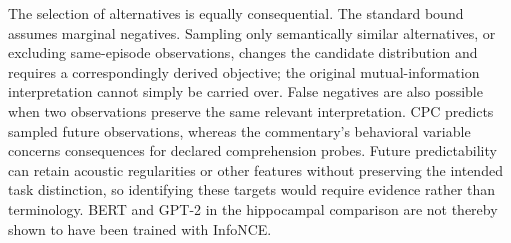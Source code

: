 \documentclass[11pt]{article}
\begin{document}
The selection of alternatives is equally consequential. The standard
bound assumes marginal negatives. Sampling only semantically similar
alternatives, or excluding same-episode observations, changes the
candidate distribution and requires a correspondingly derived objective;
the original mutual-information interpretation cannot simply be carried
over. False negatives are also possible when two observations preserve
the same relevant interpretation. CPC predicts sampled future
observations, whereas the commentary's behavioral variable concerns
consequences for declared comprehension probes. Future predictability
can retain acoustic regularities or other features without preserving
the intended task distinction, so identifying these targets would
require evidence rather than terminology. BERT and GPT-2 in the
hippocampal comparison are not thereby shown to have been trained with
InfoNCE.
\end{document}
